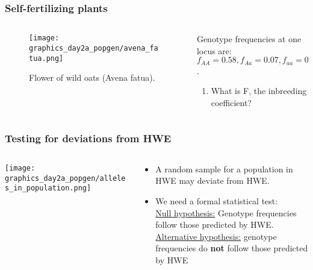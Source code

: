 \documentclass{beamer}
\newcommand{\1}{\ensuremath{\mathbf{1}}}
\begin{document}
%
%
%
\begin{frame}\frametitle{Self-fertilizing plants}
	\begin{columns}
	\begin{column}{.45\textwidth}
		\begin{figure}
		\begin{center}
			\texttt{[image: graphics\_day2a\_popgen/avena\_fatua.png]}
		\end{center}
		\caption{Flower of wild oats (Avena fatua).}
		\end{figure}
	\end{column}
	\begin{column}{.55\textwidth}
		Genotype frequencies at one locus are:\\
		$f_{AA} = 0.58, f_{Aa} = 0.07, f_{aa} = 0.35$.
		\begin{enumerate}
			\item What is F, the inbreeding coefficient?\\
		\end{enumerate}
	\end{column}
	\end{columns}
\end{frame}
%
%
%
\begin{frame}\frametitle{Testing for deviations from HWE}
	\begin{columns}
	\begin{column}{.3\textwidth}
		\begin{center}
		\texttt{[image: graphics\_day2a\_popgen/alleles\_in\_population.png]}
		\end{center}
	\end{column}
	\begin{column}{.7\textwidth}
		\begin{itemize}
			\item A random sample for a population in HWE may deviate from HWE.
			\item We need a formal statistical test:\\[1.5ex]
				\underline{Null hypothesis:} Genotype frequencies follow those predicted by HWE.\\[1.5ex]
				\underline{Alternative hypothesis:} genotype frequencies do \textbf{not} follow those predicted by HWE
		\end{itemize}
	\end{column}
	\end{columns}
\end{frame}
\end{document}
